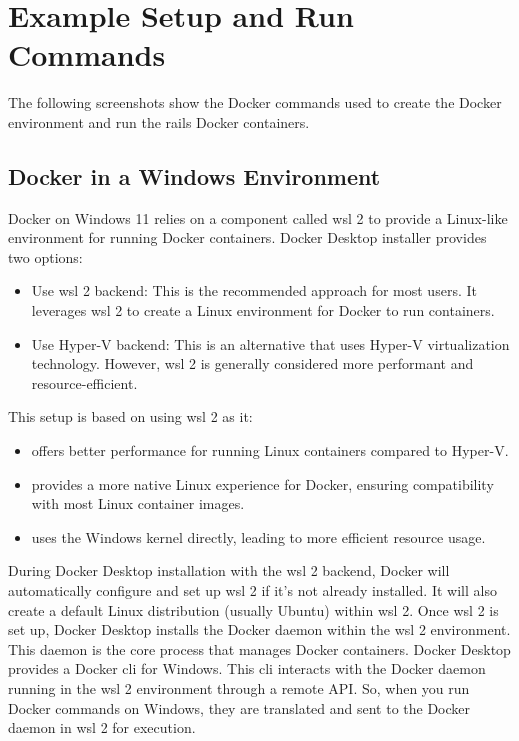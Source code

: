 \chapter{Example Setup and Run Commands}
\label{app:examplecommands}
The following screenshots show the Docker commands used to create the Docker environment and run the \gls{rails} Docker containers.
\section{Docker in a Windows Environment}
\label{sec:win-cmds}
Docker on Windows 11 relies on a component called \gls{wsl 2} to provide a Linux-like environment for running Docker containers. Docker Desktop installer provides two options:
\begin{itemize}
    \item Use \gls{wsl 2} backend: This is the recommended approach for most users. It leverages \gls{wsl 2} to create a Linux environment for Docker to run containers.
    \item Use Hyper-V backend: This is an alternative that uses Hyper-V virtualization technology. However, \gls{wsl 2} is generally considered more performant and resource-efficient.   
\end{itemize}
This setup is based on using \gls{wsl 2} as it:
\begin{itemize}
    \item offers better performance for running Linux containers compared to Hyper-V.
    \item provides a more native Linux experience for Docker, ensuring compatibility with most Linux container images.
    \item uses the Windows kernel directly, leading to more efficient resource usage.
\end{itemize}
During Docker Desktop installation with the \gls{wsl 2} backend, Docker will automatically configure and set up \gls{wsl 2} if it's not already installed. It will also create a default Linux distribution (usually Ubuntu) within \gls{wsl 2}. Once \gls{wsl 2} is set up, Docker Desktop installs the Docker daemon within the \gls{wsl 2} environment. This daemon is the core process that manages Docker containers.
Docker Desktop provides a Docker \gls{cli} for Windows. This \gls{cli} interacts with the Docker daemon running in the \gls{wsl 2} environment through a remote API. So, when you run Docker commands on Windows, they are translated and sent to the Docker daemon in \gls{wsl 2} for execution.\vspace{5mm} \\
